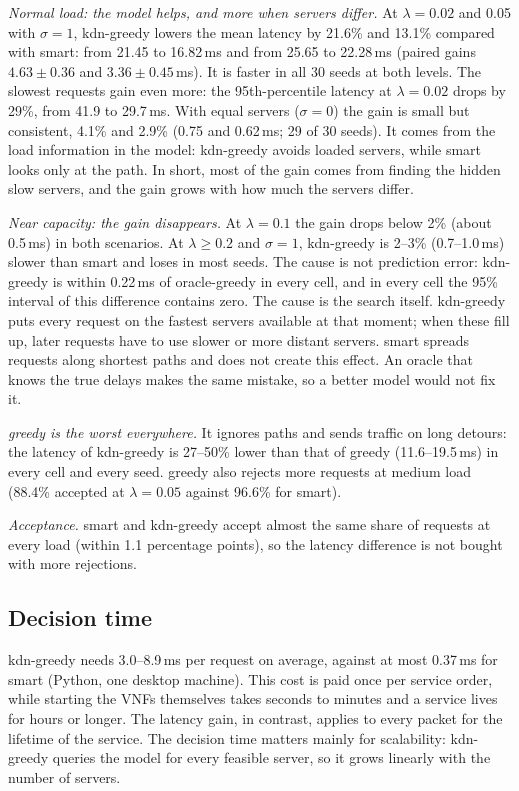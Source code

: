 \documentclass[conference,a4paper]{IEEEtran}
\begin{document}
\emph{Normal load: the model helps, and more when servers differ.} At $\lambda = 0.02$ and 0.05 with $\sigma = 1$,
kdn-greedy lowers the mean latency by 21.6\% and 13.1\% compared with smart: from 21.45 to 16.82\,ms and from
25.65 to 22.28\,ms (paired gains $4.63 \pm 0.36$ and $3.36 \pm 0.45$\,ms). It is faster in all 30 seeds at both
levels. The slowest requests gain even more: the 95th-percentile latency at $\lambda = 0.02$ drops by 29\%, from
41.9 to 29.7\,ms. With equal servers ($\sigma = 0$) the gain is small but consistent, 4.1\% and 2.9\% (0.75 and
0.62\,ms; 29 of 30 seeds). It comes from the load information in the model: kdn-greedy avoids loaded servers, while smart looks only at
the path. In short, most of the gain comes from finding the hidden slow servers, and the gain grows with how much the
servers differ.

\emph{Near capacity: the gain disappears.} At $\lambda = 0.1$ the gain drops below 2\% (about 0.5\,ms) in both
scenarios. At $\lambda \ge 0.2$ and $\sigma = 1$, kdn-greedy is 2--3\% (0.7--1.0\,ms) slower than smart and loses
in most seeds. The cause
is not prediction error: kdn-greedy is within 0.22\,ms of oracle-greedy in every cell, and in every cell the 95\%
interval of this difference contains zero. The cause is the search itself. kdn-greedy puts every
request on the fastest servers available at that moment; when these fill up, later requests have to use slower or
more distant servers. smart spreads requests along shortest paths and does not create this effect. An oracle that
knows the true delays makes the same mistake, so a better model would not fix it.

\emph{greedy is the worst everywhere.} It ignores paths and sends traffic on long detours: the latency of kdn-greedy is
27--50\% lower than that of greedy (11.6--19.5\,ms) in every cell and every seed. greedy also rejects more requests at medium load
(88.4\% accepted at $\lambda = 0.05$ against 96.6\% for smart).

\emph{Acceptance.} smart and kdn-greedy accept almost the same share of requests at every load (within 1.1
percentage points), so the latency difference is not bought with more rejections.

\subsection{Decision time}
kdn-greedy needs 3.0--8.9\,ms per request on average, against at most 0.37\,ms for smart (Python, one desktop
machine). This cost is paid once per service order, while starting the VNFs themselves takes seconds to minutes and
a service lives for hours or longer. The latency gain, in contrast, applies to every packet for the lifetime of the
service. The decision time matters mainly for scalability: kdn-greedy queries the model for every feasible server,
so it grows linearly with the number of servers.
\end{document}
